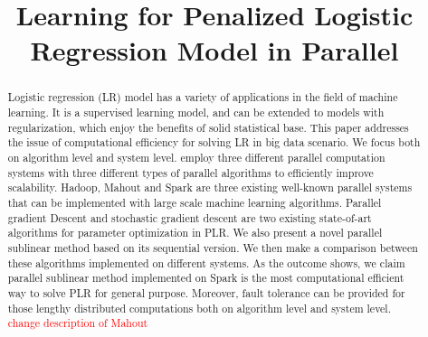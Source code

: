 \documentclass{llncs}
\newcommand{\comment}{\textcolor{red}}
\begin{document}
\mainmatter  %

\title{Learning for Penalized Logistic Regression Model in Parallel}


%
%

%
\maketitle

\begin{abstract}
Logistic regression (LR) model has a variety of applications in the field of machine learning.
It is a supervised learning model, and can be extended to models with regularization, which enjoy the benefits of solid statistical base. 
This paper addresses the issue of computational efficiency for solving LR in big data scenario.
We focus both on algorithm level and system level. employ three different parallel computation systems with three different types of parallel algorithms to efficiently improve scalability.
Hadoop, Mahout and Spark are three existing well-known parallel systems that can be implemented with large scale machine learning algorithms.
Parallel gradient Descent and stochastic gradient descent are two existing state-of-art algorithms for parameter optimization in PLR.
We also present a novel parallel sublinear method based on its sequential version.
We then make a comparison between these algorithms implemented on different systems.
As the outcome shows, we claim parallel sublinear method implemented on Spark is the most computational efficient way to solve PLR for general purpose.
Moreover, fault tolerance can be provided for those lengthy distributed computations both on algorithm level and system level.
\comment{change description of Mahout}
\end{abstract}
\end{document}
